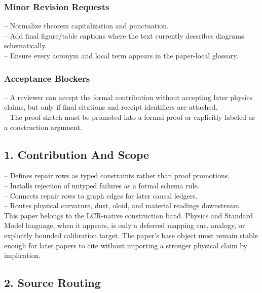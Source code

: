 \documentclass[11pt]{article}
\begin{document}
\subsubsection*{Minor Revision Requests}

\noindent{}-- Normalize theorem capitalization and punctuation.\\
\noindent{}-- Add final figure/table captions where the text currently describes diagrams schematically.\\
\noindent{}-- Ensure every acronym and local term appears in the paper-local glossary.\\

\subsubsection*{Acceptance Blockers}

\noindent{}-- A reviewer can accept the formal contribution without accepting later physics claims, but only if final citations and receipt identifiers are attached.\\
\noindent{}-- The proof sketch must be promoted into a formal proof or explicitly labeled as a construction argument.\\


\subsection*{1. Contribution And Scope}

\noindent{}-- Defines repair rows as typed constraints rather than proof promotions.\\
\noindent{}-- Installs rejection of untyped failures as a formal schema rule.\\
\noindent{}-- Connects repair rows to graph edges for later causal ledgers.\\
\noindent{}-- Routes physical curvature, dust, oloid, and material readings downstream.\\

This paper belongs to the LCR-native construction band. Physics and Standard Model language, when it appears, is only a deferred mapping cue, analogy, or explicitly bounded calibration target. The paper's base object must remain stable enough for later papers to cite without importing a stronger physical claim by implication.

\subsection*{2. Source Routing}
\end{document}
